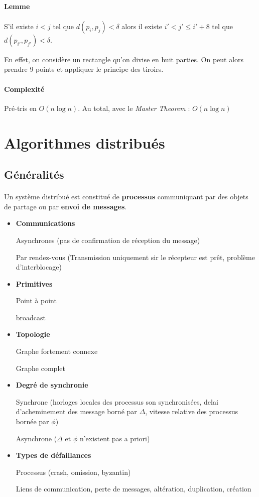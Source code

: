 \documentclass[french]{article}
\begin{document}
\paragraph{Lemme}S'il existe $i < j$ tel que $d(p_i,p_j) < \delta$ alors il existe $i' < j' \leq i'+8$ tel que $d(p_{i'},p_{j'}) < \delta$.

En effet, on considère un rectangle qu'on divise en huit parties. On peut alors prendre 9 points et appliquer le principe des tiroirs.

\paragraph{Complexité} Pré-tris en $O(n \log n)$. Au total, avec le \emph{Master Theorem} : $O(n \log n)$

\section{Algorithmes distribués}

\subsection{Généralités}

\paragraph{}Un système distribué est constitué de \textbf{processus} communiquant par des objets de partage ou par \textbf{envoi de messages}.\\

\begin{itemize}
	\item \textbf{Communications}
	
	Asynchrones (pas de confirmation de réception du message)
	
	Par rendez-vous (Transmission uniquement sir le récepteur est prêt, problème d'interblocage)
	
	\item \textbf{Primitives} 
	
	Point à point
	
	broadcast
	
	\item \textbf{Topologie}
	
	Graphe fortement connexe
	
	Graphe complet
	
	\item \textbf{Degré de synchronie}
	
	Synchrone (horloges locales des processus son synchronisées, delai d'acheminement des message borné par $\Delta$, vitesse relative des processus bornée par $\phi$)
	
	Asynchrone ($\Delta$ et $\phi$ n'existent pas a priori)
	
	\item \textbf{Types de défaillances}
	
	Processus (crash, omission, byzantin)
	
	Liens de communication, perte de messages, altération, duplication, création
\end{itemize}
\end{document}
